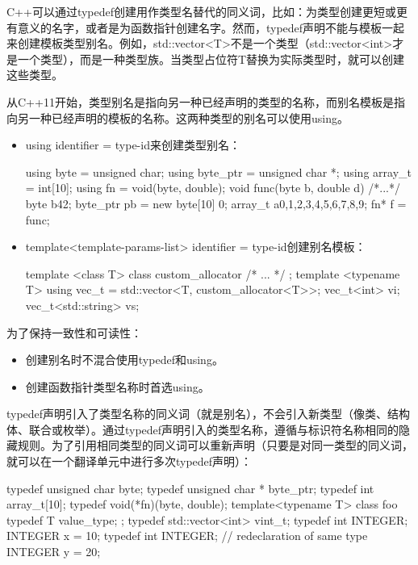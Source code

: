 
C++可以通过typedef创建用作类型名替代的同义词，比如：为类型创建更短或更有意义的名字，或者是为函数指针创建名字。然而，typedef声明不能与模板一起来创建模板类型别名。例如，std::vector<T>不是一个类型（std::vector<int>才是一个类型），而是一种类型族。当类型占位符T替换为实际类型时，就可以创建这些类型。

从C++11开始，类型别名是指向另一种已经声明的类型的名称，而别名模板是指向另一种已经声明的模板的名称。这两种类型的别名可以使用using。


\begin{itemize}
\item
using identifier = type-id来创建类型别名：

\begin{cpp}
using byte     = unsigned char;
using byte_ptr = unsigned char *;
using array_t  = int[10];
using fn       = void(byte, double);
void func(byte b, double d) { /*...*/ }
byte b{42};
byte_ptr pb = new byte[10] {0};
array_t a{0,1,2,3,4,5,6,7,8,9};
fn* f = func;
\end{cpp}

\item
template<template-params-list> identifier = type-id创建别名模板：

\begin{cpp}
template <class T>
class custom_allocator { /* ... */ };
template <typename T>
using vec_t = std::vector<T, custom_allocator<T>>;
vec_t<int>           vi;
vec_t<std::string>   vs;
\end{cpp}

\end{itemize}

为了保持一致性和可读性：

\begin{itemize}
\item
创建别名时不混合使用typedef和using。

\item
创建函数指针类型名称时首选using。
\end{itemize}


typedef声明引入了类型名称的同义词（就是别名），不会引入新类型（像类、结构体、联合或枚举）。通过typedef声明引入的类型名称，遵循与标识符名称相同的隐藏规则。为了引用相同类型的同义词可以重新声明（只要是对同一类型的同义词，就可以在一个翻译单元中进行多次typedef声明）：

\begin{cpp}
typedef unsigned char   byte;
typedef unsigned char * byte_ptr;
typedef int array_t[10];
typedef void(*fn)(byte, double);
template<typename T>
class foo {
    typedef T value_type;
};
typedef std::vector<int> vint_t;
typedef int INTEGER;
INTEGER x = 10;
typedef int INTEGER; // redeclaration of same type
INTEGER y = 20;
\end{cpp}

